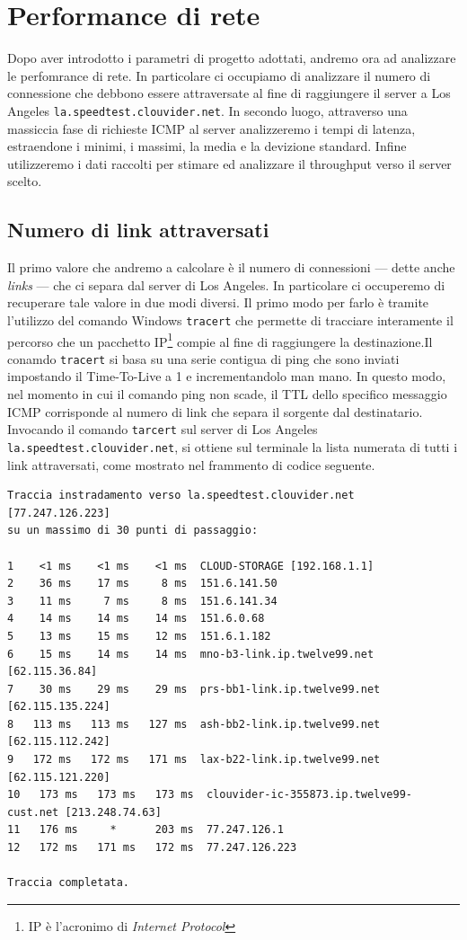 \newpage\section{Performance di rete}\label{performance}

Dopo aver introdotto i parametri di progetto adottati, andremo ora ad analizzare le perfomrance di rete. In particolare ci occupiamo di analizzare il numero di connessione che debbono essere attraversate al fine di raggiungere il server a Los Angeles \texttt{la.speedtest.clouvider.net}. In secondo luogo, attraverso una massiccia fase di richieste ICMP al server analizzeremo i tempi di latenza, estraendone i minimi, i massimi, la media e la devizione standard. Infine utilizzeremo i dati raccolti per stimare ed analizzare il throughput verso il server scelto.

\vspace{20px}\subsection{Numero di link attraversati}\label{links}

Il primo valore che andremo a calcolare è il numero di connessioni — dette anche \textsl{links} — che ci separa dal server di Los Angeles. In particolare ci occuperemo di recuperare tale valore in due modi diversi. Il primo modo per farlo è tramite l'utilizzo del comando Windows \texttt{tracert} che permette di tracciare interamente il percorso che un pacchetto IP\footnote{IP è l'acronimo di \textsl{Internet Protocol}} compie al fine di raggiungere la destinazione.Il conamdo \texttt{tracert} si basa su una serie contigua di ping che sono inviati impostando il Time-To-Live a 1 e incrementandolo man mano. In questo modo, nel momento in cui il comando ping non scade, il TTL dello specifico messaggio ICMP corrisponde al numero di link che separa il sorgente dal destinatario. Invocando il comando \texttt{tarcert} sul server di Los Angeles \texttt{la.speedtest.clouvider.net}, si ottiene sul terminale la lista numerata di tutti i link attraversati, come mostrato nel frammento di codice seguente. 

\begin{lstlisting}[style = bash]
Traccia instradamento verso la.speedtest.clouvider.net [77.247.126.223]
su un massimo di 30 punti di passaggio:

1    <1 ms    <1 ms    <1 ms  CLOUD-STORAGE [192.168.1.1] 
2    36 ms    17 ms     8 ms  151.6.141.50 
3    11 ms     7 ms     8 ms  151.6.141.34 
4    14 ms    14 ms    14 ms  151.6.0.68 
5    13 ms    15 ms    12 ms  151.6.1.182 
6    15 ms    14 ms    14 ms  mno-b3-link.ip.twelve99.net [62.115.36.84] 
7    30 ms    29 ms    29 ms  prs-bb1-link.ip.twelve99.net [62.115.135.224] 
8   113 ms   113 ms   127 ms  ash-bb2-link.ip.twelve99.net [62.115.112.242] 
9   172 ms   172 ms   171 ms  lax-b22-link.ip.twelve99.net [62.115.121.220] 
10   173 ms   173 ms   173 ms  clouvider-ic-355873.ip.twelve99-cust.net [213.248.74.63] 
11   176 ms     *      203 ms  77.247.126.1 
12   172 ms   171 ms   172 ms  77.247.126.223 

Traccia completata.
\end{lstlisting}

